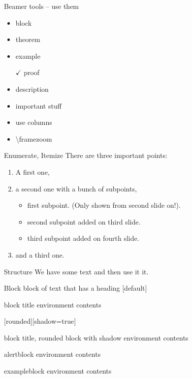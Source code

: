 \begin{frame}{Beamer tools – use them}
  \begin{itemize}
  \item block
  \item theorem
  \item<2> example
  \item[$\checkmark$] proof
  \item description
  \item \alert{important stuff}
  \item use columns
  \item \textbackslash{}framezoom
  \end{itemize}
\end{frame}


\begin{frame}{Enumerate, Itemize}
  There are three important points:
  \begin{enumerate}
    \item<1-> A first one,
    \item<2-> a second one with a bunch of subpoints,
  \begin{itemize}
    \item first subpoint. (Only shown from second slide on!).
    \item<3-> second subpoint added on third slide.
    \item<4-> third subpoint added on fourth slide.
  \end{itemize}
    \item<5-> and a third one.
  \end{enumerate}
\end{frame}


\begin{frame}{Structure}
  We have some text and then use  it it.
\end{frame}

\begin{frame}{Block}
  block of text that has a heading
  [default]
  \begin{block}{block title}
  environment contents
  \end{block}
  [rounded][shadow=true]
  \begin{block}{block title, rounded block with shadow}
  environment contents
  \end{block}
  \begin{alertblock}{alertblock}
  environment contents
  \end{alertblock}
  \begin{exampleblock}{exampleblock}
  environment contents
  \end{exampleblock}
\end{frame}


